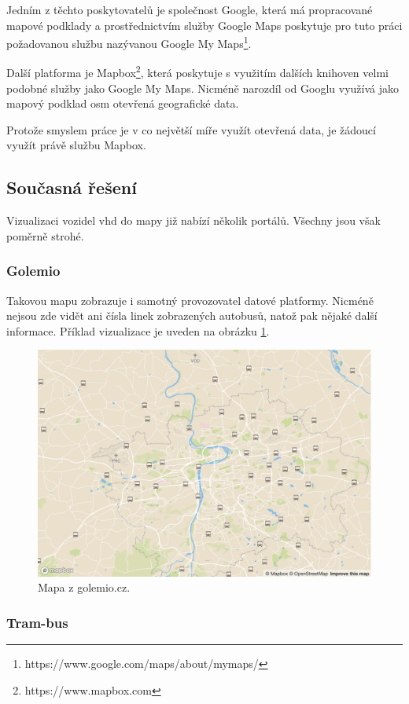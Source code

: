 \bigbreak

Jedním z těchto poskytovatelů je společnost Google, která má propracované mapové podklady a prostřednictvím služby Google Maps poskytuje pro tuto práci požadovanou službu nazývanou Google My Maps\footnote{https://www.google.com/maps/about/mymaps/}.

\bigbreak

Další platforma je Mapbox\footnote{https://www.mapbox.com}, která poskytuje s využitím dalších knihoven velmi podobné služby jako Google My Maps. Nicméně narozdíl od Googlu využívá jako mapový podklad \gls{osm} {otevřená geografické data}.

\bigbreak

Protože smyslem práce je v co největší míře využít otevřená data, je žádoucí využít právě službu Mapbox.

\subsection{Současná řešení} \label{subsection:soucasna_reseni_front_end}

Vizualizaci vozidel \gls{vhd} do mapy již nabízí několik portálů. Všechny jsou však poměrně strohé.

\subsubsection{Golemio}

Takovou mapu zobrazuje i samotný provozovatel datové platformy. Nicméně nejsou zde vidět ani čísla linek zobrazených autobusů, natož pak nějaké další informace. Příklad vizualizace je uveden na obrázku \ref{fig:golemio_result}.

\begin{figure}
	\centering
  \includegraphics[width=0.5\linewidth]{../img/golemio_mapa.png}
  \caption{Mapa z golemio.cz.}
  \label{fig:golemio_result}
\end{figure}

\subsubsection{Tram-bus}

